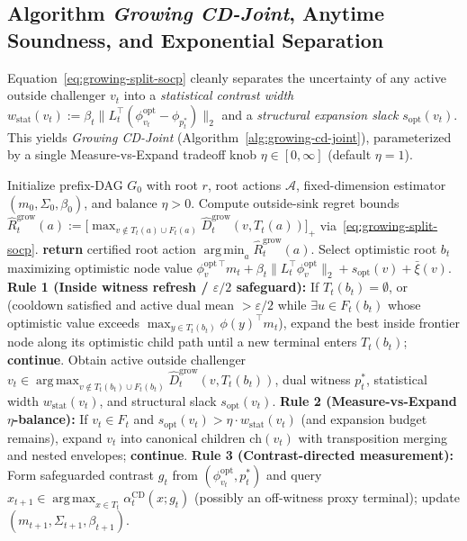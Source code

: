 \documentclass{article}
\theoremstyle{plain}
\theoremstyle{definition}
\DeclareMathOperator*{\argmax}{arg\,max}
\DeclareMathOperator*{\argmin}{arg\,min}
\begin{document}
\subsection{Algorithm \emph{Growing CD-Joint}, Anytime Soundness, and Exponential Separation}
\label{app:growing-alg}

Equation~\eqref{eq:growing-split-socp} cleanly separates the uncertainty of any active outside challenger $v_t$ into a \emph{statistical contrast width} $w_{\mathrm{stat}}(v_t) := \beta_t \|L_t^\top(\phi_{v_t}^{\mathrm{opt}} - \phi_{p_t^*})\|_2$ and a \emph{structural expansion slack} $s_{\mathrm{opt}}(v_t)$. This yields \emph{Growing CD-Joint} (Algorithm~\ref{alg:growing-cd-joint}), parameterized by a single Measure-vs-Expand tradeoff knob $\eta \in [0, \infty]$ (default $\eta = 1$).

\begin{algorithm}[!htbp]
\caption{\emph{Growing CD-Joint}: joint root certification on growing implicit search DAGs}
\label{alg:growing-cd-joint}
\begin{algorithmic}[1]
\STATE Initialize prefix-DAG $G_0$ with root $r$, root actions $\mathcal{A}$, fixed-dimension estimator $(m_0, \Sigma_0, \beta_0)$, and balance $\eta > 0$.
\LOOP
  \STATE Compute outside-sink regret bounds $\widehat R_t^{\mathrm{grow}}(a) := \bigl[\max_{v \notin T_t(a) \cup F_t(a)} \widehat D_t^{\mathrm{grow}}(v, T_t(a))\bigr]_+$ via~\eqref{eq:growing-split-socp}.
    \STATE \textbf{return} certified root action $\argmin_a \widehat R_t^{\mathrm{grow}}(a)$.
  \ENDIF
  \STATE Select optimistic root $b_t$ maximizing optimistic node value $\phi_v^{\mathrm{opt}\,\top} m_t + \beta_t \|L_t^\top \phi_v^{\mathrm{opt}}\|_2 + s_{\mathrm{opt}}(v) + \bar\xi(v)$.
  \STATE \textbf{Rule 1 (Inside witness refresh / $\varepsilon/2$ safeguard):} If $T_t(b_t) = \emptyset$, or (cooldown satisfied and active dual mean $> \varepsilon/2$ while $\exists u \in F_t(b_t)$ whose optimistic value exceeds $\max_{y \in T_t(b_t)} \phi(y)^\top m_t$), expand the best inside frontier node along its optimistic child path until a new terminal enters $T_t(b_t)$; \textbf{continue}.
  \STATE Obtain active outside challenger $v_t \in \argmax_{v \notin T_t(b_t) \cup F_t(b_t)} \widehat D_t^{\mathrm{grow}}(v, T_t(b_t))$, dual witness $p_t^*$, statistical width $w_{\mathrm{stat}}(v_t)$, and structural slack $s_{\mathrm{opt}}(v_t)$.
  \STATE \textbf{Rule 2 (Measure-vs-Expand $\eta$-balance):} If $v_t \in F_t$ and $s_{\mathrm{opt}}(v_t) > \eta \cdot w_{\mathrm{stat}}(v_t)$ (and expansion budget remains), expand $v_t$ into canonical children $\mathrm{ch}(v_t)$ with transposition merging and nested envelopes; \textbf{continue}.
  \STATE \textbf{Rule 3 (Contrast-directed measurement):} Form safeguarded contrast $g_t$ from $(\phi_{v_t}^{\mathrm{opt}}, p_t^*)$ and query $x_{t+1} \in \argmax_{x \in T_t} \alpha_t^{\mathrm{CD}}(x; g_t)$ (possibly an off-witness proxy terminal); update $(m_{t+1}, \Sigma_{t+1}, \beta_{t+1})$.
\ENDLOOP
\end{algorithmic}
\end{algorithm}
\end{document}
